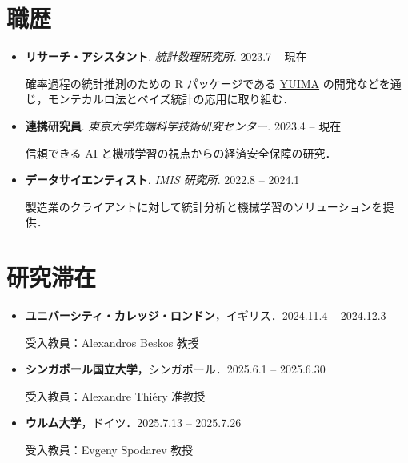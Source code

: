 \documentclass[
  11pt,
]{article}
\renewcommand{\labelitemi}{\textcolor{minty}{\faCheckCircle}} %
\begin{document}
\section{職歴}\label{ux8077ux6b74}

\renewcommand{\labelitemi}{\textcolor{minty}{\faUniversity}}

\begin{itemize}
\item
  \textbf{リサーチ・アシスタント}. \emph{統計数理研究所}. \hfill {2023.7
  -- 現在}

  確率過程の統計推測のための R パッケージである
  \href{https://r-forge.r-project.org/projects/yuima/}{YUIMA}
  の開発などを通じ，モンテカルロ法とベイズ統計の応用に取り組む．
\item
  \textbf{連携研究員}. \emph{東京大学先端科学技術研究センター}.
  \hfill {2023.4 -- 現在}

  信頼できる AI と機械学習の視点からの経済安全保障の研究．
\item
  \textbf{データサイエンティスト}. \emph{IMIS 研究所}. \hfill {2022.8 --
  2024.1}

  製造業のクライアントに対して統計分析と機械学習のソリューションを提供．
\end{itemize}

\section{研究滞在}\label{ux7814ux7a76ux6edeux5728}

\begin{itemize}
\item
  \textbf{ユニバーシティ・カレッジ・ロンドン}，イギリス．\hfill {2024.11.4
  -- 2024.12.3}

  受入教員：Alexandros Beskos 教授
\item
  \textbf{シンガポール国立大学}，シンガポール．\hfill {2025.6.1 --
  2025.6.30}

  受入教員：Alexandre Thiéry 准教授
\item
  \textbf{ウルム大学}，ドイツ．\hfill {2025.7.13 -- 2025.7.26}

  受入教員：Evgeny Spodarev 教授
\end{itemize}

\renewcommand{\labelitemi}{\textcolor{minty}{\faBookmark}}
\end{document}
